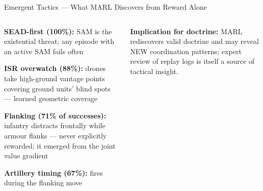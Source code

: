 \documentclass[aspectratio=169,10pt,t]{beamer}
\begin{document}
\begin{frame}{Emergent Tactics --- What MARL Discovers from Reward Alone}
\begin{columns}[T]
\begin{tl}\item \textbf{SEAD-first (100\%):} SAM is the existential threat; any episode with an active SAM fails often\item \textbf{ISR overwatch (88\%):} drones take high-ground vantage points covering ground units' blind spots --- learned geometric coverage\item \textbf{Flanking (71\% of successes):} infantry distracts frontally while armour flanks --- never explicitly rewarded; it emerged from the joint value gradient\item \textbf{Artillery timing (67\%):} fires during the flanking move\end{tl}
\begin{rbox}\scriptsize\textbf{Implication for doctrine:} MARL rediscovers valid doctrine and may reveal NEW coordination patterns; expert review of replay logs is itself a source of tactical insight.\end{rbox}
\end{columns}
\end{frame}
\end{document}
